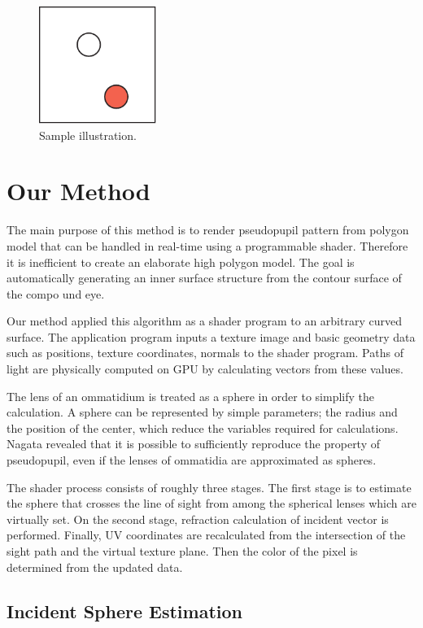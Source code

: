 \begin{figure}[ht]
  \centering
  \includegraphics[width=1.5in]{images/samplefigure}
  \caption{Sample illustration.}
\end{figure}

\section{Our Method}

The main purpose of this method is to render pseudopupil pattern from polygon model that can be handled in real-time using a programmable shader. Therefore it is inefficient to create an elaborate high polygon model.
The goal is automatically generating an inner surface structure from the contour surface of the compo und eye. 

Our method applied this algorithm as a shader program to an arbitrary curved surface.
The application program inputs a texture image and basic geometry data such as positions, texture coordinates, normals to the shader program.
Paths of light are physically computed on GPU by calculating vectors from these values.

The lens of an ommatidium is treated as a sphere in order to simplify the calculation.
A sphere can be represented by simple parameters; the radius and the position of the center, which reduce the variables required for calculations.
Nagata\cite{} revealed that it is possible to sufficiently reproduce the property of pseudopupil, even if the lenses of ommatidia are approximated as spheres.

The shader process consists of roughly three stages.
The first stage is to estimate the sphere that crosses the line of sight from among the spherical lenses which are virtually set.
On the second stage, refraction calculation of incident vector is performed. Finally, UV coordinates are recalculated from the intersection of the sight path and the virtual texture plane. Then the color of the pixel is determined from the updated data.

\subsection{Incident Sphere Estimation}


